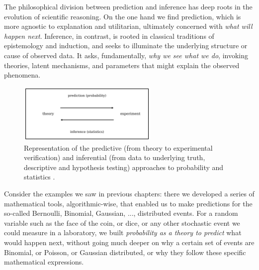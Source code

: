 \documentclass{book}
\begin{document}
The philosophical division between prediction and inference has deep roots in the evolution of scientific reasoning. On the one hand we find prediction, which is more agnostic to explanation and utilitarian, ultimately concerned with \textit{what will happen next}. Inference, in contrast, is rooted in classical traditions of epistemology and induction, and seeks to illuminate the underlying structure or cause of observed data. It asks, fundamentally, \textit{why we see what we do}, invoking theories, latent mechanisms, and parameters that might explain the observed phenomena.\\

\begin{figure}[ht]
    \centering
    \includegraphics[width=0.6\textwidth]{figures/chapter4/probability_vs_statistics.png}
    \caption{Representation of the predictive (from theory to experimental verification) and inferential (from data to underlying truth, descriptive and hypothesis testing) approaches to probability and statistics \cite{pearson1900}.}
    \label{fig:prob_vs_stats1}
\end{figure}

Consider the examples we saw in previous chapters: there we developed a series of mathematical tools, algorithmic-wise, that enabled us to make predictions for the so-called Bernoulli, Binomial, Gaussian, ..., distributed events. For a random variable such as the face of the coin, or dice, or any other stochastic event we could measure in a laboratory, we built \textit{probability as a theory to predict} what would happen next, without going much deeper on why a certain set of events are Binomial, or Poisson, or Gaussian distributed, or why they follow these specific mathematical expressions.\\
\end{document}
